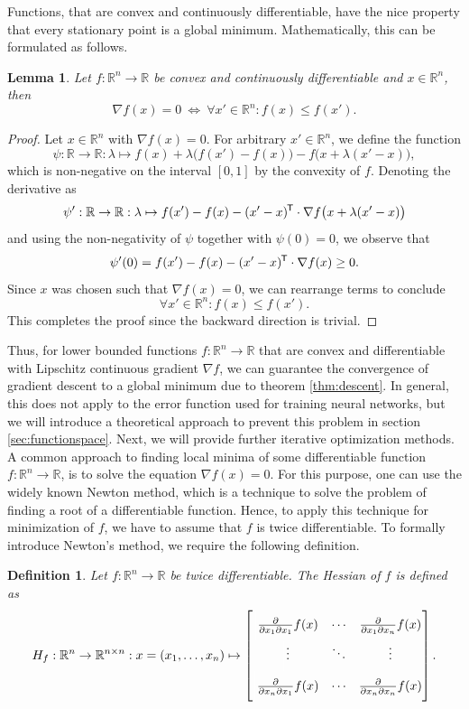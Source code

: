 \documentclass[11pt, a4paper]{article}
\newtheorem{lemma}[theorem]{Lemma}
\newtheorem{definition}[theorem]{Definition}
\newcommand{\R}{\mathbb{R}}
\newcommand*{\tr}{^{\mkern-1.5mu\mathsf{T}}}
\begin{document}
Functions, that are convex and continuously differentiable, have the nice property that every stationary point is a global minimum. Mathematically, this can be formulated as follows.

\begin{lemma}
Let $f: \R^n \to \R$ be convex and continuously differentiable and $x \in \R^n$, then
\[ \nabla f(x) = 0 \ \Leftrightarrow \ \forall x' \in \R^n : f(x) \leq f(x').  \]
\end{lemma}

\begin{proof}
Let $x \in \R^n$ with $\nabla f(x) = 0$. For arbitrary $x' \in \R^n$, we define the function
\[ \psi : \R \to \R : \lambda \mapsto f(x) + \lambda \big ( f(x') - f(x) \big ) - f \big ( x + \lambda (x'-x) \big ), \]
which is non-negative on the interval $[0,1]$ by the convexity of $f$. Denoting the derivative as
\[ \psi' : \R \to \R : \lambda \mapsto f(x') - f(x) - (x'-x) \tr \cdot \nabla f \big (x + \lambda(x'-x)\big ) \]
and using the non-negativity of $\psi$ together with $\psi(0) = 0$, we observe that
\[ \psi'(0) = f(x') - f(x) - (x'-x) \tr \cdot \nabla f(x) \geq 0. \]
Since $x$ was chosen such that $\nabla f(x) = 0$, we can rearrange terms to conclude
\[ \forall x' \in \R^n : f(x) \leq f(x'). \]
This completes the proof since the backward direction is trivial.
\end{proof}

Thus, for lower bounded functions $f: \R^n \to \R$ that are convex and differentiable with Lipschitz continuous gradient $\nabla f$, we can guarantee the convergence of gradient descent to a global minimum due to theorem \ref{thm:descent}. In general, this does not apply to the error function used for training neural networks, but we will introduce a theoretical approach to prevent this problem in section \ref{sec:functionspace}. Next, we will provide further iterative optimization methods. \\

A common approach to finding local minima of some differentiable function $f: \R^n \to \R$, is to solve the equation $\nabla f(x) = 0$. For this purpose, one can use the widely known Newton method, which is a technique to solve the problem of finding a root of a differentiable function. Hence, to apply this technique for minimization of $f$, we have to assume that $f$ is twice differentiable. To formally introduce Newton's method, we require the following definition.

\begin{definition}
Let $f: \R^n \to \R$ be twice differentiable. The Hessian of $f$ is defined as
\[ H_f : \R^n \to \R^{n \times n} : x = (x_1, \dots, x_n) \mapsto \begin{bmatrix} \textcolor{white}{\bigg |} \frac{\partial}{\partial x_1 \partial x_1} f(x) & \cdots & \frac{\partial}{\partial x_1 \partial x_n} f(x) \\ \textcolor{white}{\bigg |} \vdots & \ddots & \vdots \\ \textcolor{white}{\bigg |} \frac{\partial}{\partial x_n \partial x_1} f(x) & \cdots & \frac{\partial}{\partial x_n \partial x_n} f(x) \end{bmatrix}. \]
\end{definition}
\end{document}

